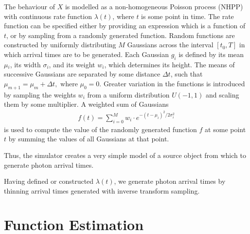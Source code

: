 \documentclass[a4paper,11pt]{article}
\begin{document}
The behaviour of $X$ is modelled as a non-homogeneous Poisson process (NHPP)
with continuous rate function $\lambda(t)$, where $t$ is some point in time. The
rate function can be specified either by providing an expression which is a
function of $t$, or by sampling from a randomly generated function. Random
functions are constructed by uniformly distributing $M$ Gaussians across the
interval $\left[t_0,T\right]$ in which arrival times are to be generated. Each
Gaussian $g_i$ is defined by its mean $\mu$$_i$, its width $\sigma$$_i$, and its
weight $w_i$, which determines its height. The means of successive Gaussians are
separated by some distance $\Delta t$, such that $\mu_{m+1}=\mu_m + \Delta
t,\text{ where } \mu_0=0$. Greater variation in the functions is introduced by
sampling the weights $w_i$ from a uniform distribution $U(-1,1)$ and scaling
them by some multiplier. A weighted sum of Gaussians
\begin{align}
   f(t) = \sum_{i=0}^M w_i\cdot e^{-(t-\mu_i)^2/2\sigma_i^2}
\end{align}
is used to compute the value of the randomly generated function $f$ at some
point $t$ by summing the values of all Gaussians at that point.

Thus, the simulator creates a very simple model of a source object from which to
generate photon arrival times.

Having defined or constructed $\lambda(t)$, we generate photon arrival times by
thinning arrival times generated with inverse transform sampling.

\begin{comment}
  \begin{algorithm}[H]
    \begin{algorithmic}[1]
      \REQUIRE $\lambda\geq \lambda(t), 0 \leq t \leq T$
      \STATE $\Phi=\emptyset$, $t=0$, $T=\text{interval length}$
      \WHILE{$t<T$}
      \STATE Generate $U_1\sim U(0,1)$
      \STATE $\phi_n=t-\frac{1}{\lambda}\ln(U_1)$
      \STATE Generate $U_2\sim U(0,1)$, independent of $U_1$
      \IF{$U_2\leq\frac{\lambda(t)}{\lambda}$}
      \STATE $\Phi \leftarrow \phi_n$
      \ENDIF
      \ENDWHILE
      \RETURN $\Phi$
    \end{algorithmic}
    \caption{Simulating T Time Units of a NHPP by Thinning}
    \label{alg:seq}
  \end{algorithm}
\end{comment}
\section{Function Estimation}
\label{sec-4}
\end{document}
